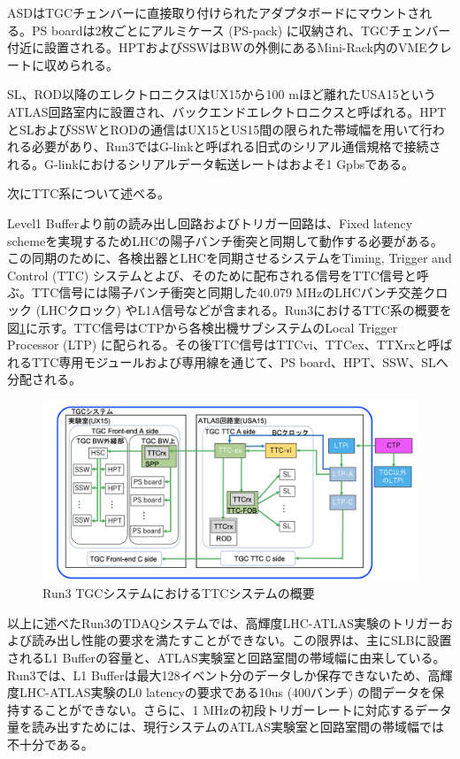 ASDはTGCチェンバーに直接取り付けられたアダプタボードにマウントされる。PS boardは2枚ごとにアルミケース (PS-pack) に収納され、TGCチェンバー付近に設置される。HPTおよびSSWはBWの外側にあるMini-Rack内のVMEクレートに収められる。

SL、ROD以降のエレクトロニクスはUX15から100 mほど離れたUSA15というATLAS回路室内に設置され、バックエンドエレクトロニクスと呼ばれる。HPTとSLおよびSSWとRODの通信はUX15とUS15間の限られた帯域幅を用いて行われる必要があり、Run3ではG-linkと呼ばれる旧式のシリアル通信規格で接続される。G-linkにおけるシリアルデータ転送レートはおよそ1 Gpbsである。

次にTTC系について述べる。

Level1 Bufferより前の読み出し回路およびトリガー回路は、Fixed latency schemeを実現するためLHCの陽子バンチ衝突と同期して動作する必要がある。この同期のために、各検出器とLHCを同期させるシステムをTiming, Trigger and Control (TTC) システムとよび、そのために配布される信号をTTC信号と呼ぶ。TTC信号には陽子バンチ衝突と同期した40.079 MHzのLHCバンチ交差クロック (LHCクロック) やL1A信号などが含まれる。Run3におけるTTC系の概要を図\ref{Run3_TTC}に示す。TTC信号はCTPから各検出機サブシステムのLocal Trigger Processor (LTP) に配られる。その後TTC信号はTTCvi、TTCex、TTXrxと呼ばれるTTC専用モジュールおよび専用線を通じて、PS board、HPT、SSW、SLへ分配される。

\begin{figure} 
\centering
\includegraphics[width=16cm]{fig/Intro/Run3_TTC.png}
\caption[Run3 TGCシステムにおけるTTCシステムの概要]{Run3 TGCシステムにおけるTTCシステムの概要\cite{JINST:2008}}
\label{Run3_TTC}
\end{figure}

以上に述べたRun3のTDAQシステムでは、高輝度LHC-ATLAS実験のトリガーおよび読み出し性能の要求を満たすことができない。この限界は、主にSLBに設置されるL1 Bufferの容量と、ATLAS実験室と回路室間の帯域幅に由来している。Run3では、L1 Bufferは最大128イベント分のデータしか保存できないため、高輝度LHC-ATLAS実験のL0 latencyの要求である10us (400バンチ) の間データを保持することができない。さらに、1 MHzの初段トリガーレートに対応するデータ量を読み出すためには、現行システムのATLAS実験室と回路室間の帯域幅では不十分である。

